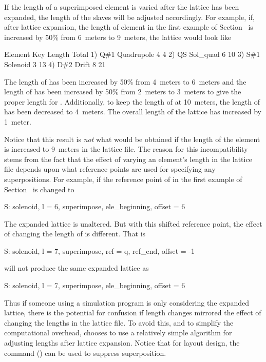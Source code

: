 If the length of a superimposed element is varied after the lattice
has been expanded, the length of the slaves will be adjusted
accordingly. For example, if, after lattice expansion, the length of
element  in the first example of Section~ is
increased by 50\% from 6~meters to 9~meters, the lattice would look
like
\begin{example}
        Element   Key         Length  Total
  1)    Q{\#}1       Quadrupole   4        4
  2)    Q{\B}S       Sol_quad     6       10
  3)    S{\#}1       Solenoid     3       13
  4)    D{\#}2       Drift        8       21
\end{example}
The length of  has been increased by 50\% from 4~meters to
6~meters and the length of  has been increased by 50\% from
2~meters to 3~meters to give the proper length for .
Additionally, to keep the length of  at 10~meters, the
length of  has been decreased to 4~meters. The overall
length of the lattice has increased by 1~meter.

Notice that this result is {\em not} what would be obtained if the
length of the element  is increased to 9~meters in the lattice
file. The reason for this incompatibility stems from the fact that the
effect of varying an element's length in the lattice file depends upon
what reference points are used for specifying any superpositions. For
example, if the reference point of  in the first example of
Section~ is changed to
\begin{example}
  S: solenoid, l = 6, superimpose, ele_beginning, offset = 6
\end{example}
The expanded lattice is unaltered. But with this shifted reference
point, the effect of changing the length of  is different. That is
\begin{example}
  S: solenoid, l = 7, superimpose, ref = q, ref_end, offset = -1
\end{example}
will not produce the same expanded lattice as
\begin{example}
  S: solenoid, l = 7, superimpose, ele_beginning, offset = 6
\end{example}
Thus if someone using a simulation program is only considering the
expanded lattice, there is the potential for confusion if length
changes mirrored the effect of changing the lengths in the lattice
file.  To avoid this, and to simplify the computational overhead,
\bmad chooses to use a relatively simple algorithm for adjusting
lengths after lattice expansion. Notice that for layout design, the
 command () can be used to
suppress superposition.

